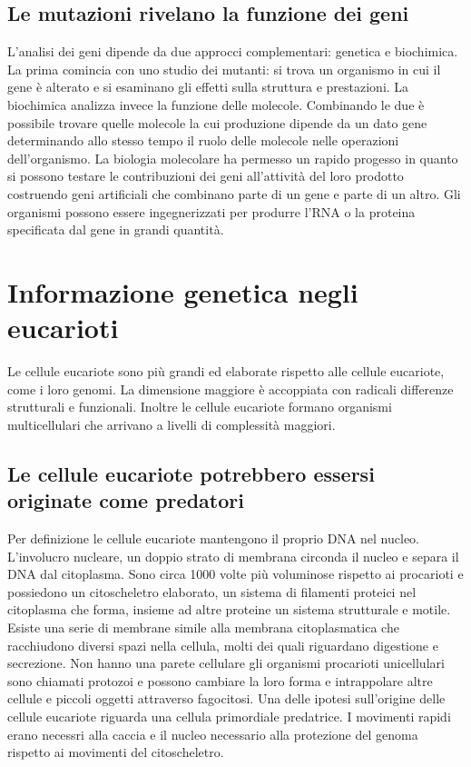 \subsection{Le mutazioni rivelano la funzione dei geni}
L'analisi dei geni dipende da due approcci complementari: genetica e biochimica. La prima comincia con uno studio dei mutanti: si trova un organismo in cui il gene \`e alterato e si 
esaminano gli effetti sulla struttura e prestazioni. La biochimica analizza invece la funzione delle molecole. Combinando le due \`e possibile trovare quelle molecole la cui produzione
dipende da un dato gene determinando allo stesso tempo il ruolo delle molecole nelle operazioni dell'organismo. La biologia molecolare ha permesso un rapido progesso in quanto
si possono testare le contribuzioni dei geni all'attivit\`a del loro prodotto costruendo geni artificiali che combinano parte di un gene e parte di un altro. Gli organismi possono essere
ingegnerizzati per produrre l'RNA o la proteina specificata dal gene in grandi quantit\`a.
\section{Informazione genetica negli eucarioti}
Le cellule eucariote sono pi\`u grandi ed elaborate rispetto alle cellule eucariote, come i loro genomi. La dimensione maggiore \`e accoppiata con radicali differenze strutturali e
funzionali. Inoltre le cellule eucariote formano organismi multicellulari che arrivano a livelli di complessit\`a maggiori. 
\subsection{Le cellule eucariote potrebbero essersi originate come predatori}
Per definizione le cellule eucariote mantengono il proprio DNA nel nucleo. L'involucro nucleare, un doppio strato di membrana circonda il nucleo e separa il DNA dal citoplasma. Sono
circa 1000 volte pi\`u voluminose rispetto ai procarioti e possiedono un citoscheletro elaborato, un sistema di filamenti proteici nel citoplasma che forma, insieme ad altre proteine
un sistema strutturale e motile. Esiste una serie di membrane simile alla membrana citoplasmatica che racchiudono diversi spazi nella cellula, molti dei quali riguardano digestione e
secrezione. Non hanno una parete cellulare gli organismi procarioti unicellulari sono chiamati protozoi e possono cambiare la loro forma e intrappolare altre cellule e piccoli oggetti
attraverso fagocitosi. Una delle ipotesi sull'origine delle cellule eucariote riguarda una cellula primordiale predatrice. I movimenti rapidi erano necessri alla caccia e il nucleo 
necessario alla protezione del genoma rispetto ai movimenti del citoscheletro.

